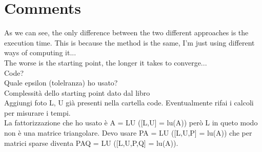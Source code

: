 \documentclass[]{article}
\begin{document}
\section{Comments}
As we can see, the only difference between the two different approaches is the execution time. This is because the method is the same, I'm just using different ways of computing it...\\
The worse is the starting point, the longer it takes to converge...\\
Code?\\
Quale epsilon (tolelranza) ho usato?\\
Complessità dello starting point dato dal libro\\
Aggiungi foto L, U già presenti nella cartella code. Eventualmente rifai i calcoli per misurare i tempi.\\
La fattorizzazione che ho usato è A = LU ([L,U] = lu(A)) però L in queto modo non è una matrice triangolare. Devo usare PA = LU ([L,U,P] = lu(A)) che per matrici sparse diventa PAQ = LU ([L,U,P,Q] = lu(A)).\\
\end{document}
